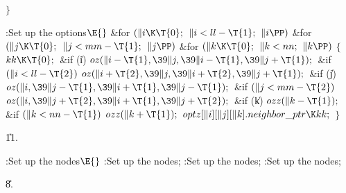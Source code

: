 \4${}\}{}$\2\par
\Y\B\4:Set up the  options\X${}\E{}$\6
\&{for} ${}(\|i\K\T{0};{}$ ${}\|i<\\{ll}-\T{1};{}$ ${}\|i\PP){}$\1\6
\&{for} ${}(\|j\K\T{0};{}$ ${}\|j<\\{mm}-\T{1};{}$ ${}\|j\PP){}$\1\6
\&{for} ${}(\|k\K\T{0};{}$ ${}\|k<\\{nn};{}$ ${}\|k\PP){}$\5
${}\{{}$\1\6
${}\\{kk}\K\T{0};{}$\6
\&{if} (\|i)\1\5
${}\\{oz}(\|i-\T{1},\39\|j,\39\|i-\T{1},\39\|j+\T{1});{}$\2\6
\&{if} ${}(\|i<\\{ll}-\T{2}){}$\1\5
${}\\{oz}(\|i+\T{2},\39\|j,\39\|i+\T{2},\39\|j+\T{1});{}$\2\6
\&{if} (\|j)\1\5
${}\\{oz}(\|i,\39\|j-\T{1},\39\|i+\T{1},\39\|j-\T{1});{}$\2\6
\&{if} ${}(\|j<\\{mm}-\T{2}){}$\1\5
${}\\{oz}(\|i,\39\|j+\T{2},\39\|i+\T{1},\39\|j+\T{2});{}$\2\6
\&{if} (\|k)\1\5
${}\\{ozz}(\|k-\T{1});{}$\2\6
\&{if} ${}(\|k<\\{nn}-\T{1}){}$\1\5
${}\\{ozz}(\|k+\T{1});{}$\2\6
${}\\{optz}[\|i][\|j][\|k].\\{neighbor\_ptr}\K\\{kk};{}$\6
\4${}\}{}$\2\2\2\par
\U11.\fi

\B{}:Set up the nodes\X${}\E{}$\6
:Set up the  nodes\X;\6
:Set up the  nodes\X;\6
:Set up the  nodes\X;\par
\U8.\fi

